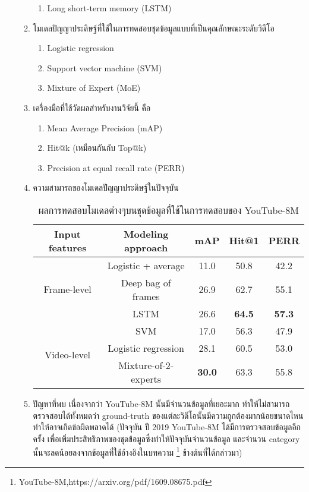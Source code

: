 \begin{enumerate}
\begin{enumerate}
\begin{enumerate}
				\item Long short-term memory (LSTM)
			\end{enumerate}
		\item โมเดลปัญญาประดิษฐ์ที่ใช้ในการทดสอบชุดข้อมูลแบบที่เป็นคุณลักษณะระดับวิดีโอ
			\begin{enumerate}
				\setlength\itemsep{-0.25em}
				\item Logistic regression
				\item Support vector machine (SVM)
				\item Mixture of Expert (MoE)
			\end{enumerate}
		\item เครื่องมือที่ใช้วัดผลสำหรับงานวิจัยนี้ คือ
			\begin{enumerate}
				\setlength\itemsep{-0.25em}
				\item Mean Average Precision (mAP)
				\item Hit@k (เหมือนกันกับ Top@k)
				\item Precision at equal recall rate (PERR)
			\end{enumerate}
		\item ความสามารถของโมเดลปัญญาประดิษฐ์ในปัจจุบัน
			\begin{table}[!ht]
				\centering
				\begin{tabular}{|c|c|c|c|c|}
					\hline
					{Input features} & {Modeling approach} & {mAP} & Hit@1 & PERR\\
					\hline
					\multirow{3}{*}{Frame-level} & Logistic + average & 11.0 & 50.8 & 42.2\\
					& Deep bag of frames & 26.9 & 62.7 & 55.1\\
					& LSTM & 26.6 & \textbf{64.5} & \textbf{57.3}\\
					\hline
					\multirow{3}{*}{Video-level} & SVM & 17.0 & 56.3 & 47.9\\
					& Logistic regression & 28.1 & 60.5 & 53.0\\
					& Mixture-of-2-experts & \textbf{30.0} & 63.3 & 55.8\\
					\hline
				\end{tabular}
				\caption{ผลการทดสอบโมเดลต่างๆบนชุดข้อมูลที่ใช้ในการทดสอบของ YouTube-8M}
				\label{tab: youtube_youtube}
			\end{table}
		\item ปัญหาที่พบ
			เนื่องจากว่า YouTube-8M นั้นมีจำนวนข้อมูลที่เยอะมาก ทำให้ไม่สามารถตรวจสอบได้ทั้งหมดว่า ground-truth ของแต่ละวิดีโอนั้นมีความถูกต้องมากน้อยขนาดไหน ทำให้อาจเกิดข้อผิดพลาดได้ (ปัจจุบัน ปี 2019 YouTube-8M ได้มีการตรวจสอบข้อมูลอีกครั้ง เพื่อเพิ่มประสิทธิภาพของชุดข้อมูลซึ่งทำให้ปัจจุบันจำนวนข้อมูล และจำนวน category นั้นจะลดน้อยลงจากข้อมูลที่ใช้อ้างอิงในบทความ \footnote{YouTube-8M,https://arxiv.org/pdf/1609.08675.pdf} ข้างต้นที่ได้กล่าวมา)
	\end{enumerate}	
\end{enumerate}
